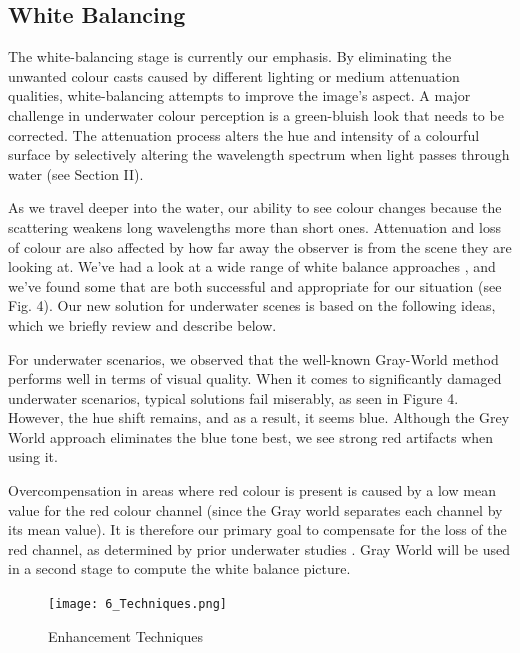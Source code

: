 \documentclass[conference]{IEEEtran}
\begin{document}
\subsection{White Balancing}
The white-balancing stage is currently our emphasis. By eliminating the unwanted colour casts caused by different lighting or medium attenuation qualities, white-balancing attempts to improve the image's aspect. A major challenge in underwater colour perception is a green-bluish look that needs to be corrected. The attenuation process alters the hue and intensity of a colourful surface by selectively altering the wavelength spectrum when light passes through water (see Section II). 
\\
\par
As we travel deeper into the water, our ability to see colour changes because the scattering weakens long wavelengths more than short ones. Attenuation and loss of colour are also affected by how far away the observer is from the scene they are looking at. We've had a look at a wide range of white balance approaches \cite{key:article}, and we've found some that are both successful and appropriate for our situation (see Fig. 4). Our new solution for underwater scenes is based on the following ideas, which we briefly review and describe below.\\
\par
For underwater scenarios, we observed that the well-known Gray-World method \cite{color constancy} performs well in terms of visual quality. When it comes to significantly damaged underwater scenarios, typical solutions fail miserably, as seen in Figure 4. However, the hue shift remains, and as a result, it seems blue. Although the Grey World approach eliminates the blue tone best, we see strong red artifacts when using it.\\
\par
Overcompensation in areas where red colour is present is caused by a low mean value for the red colour channel (since the Gray world separates each channel by its mean value). It is therefore our primary goal to compensate for the loss of the red channel, as determined by prior underwater studies \cite{Buchsbaum}\cite{drews2013transmission}. Gray World will be used in a second stage to compute the white balance picture.\\

\begin{figure}
\texttt{[image: 6\_Techniques.png]}
\caption{Enhancement Techniques}
\end{figure}
\end{document}
